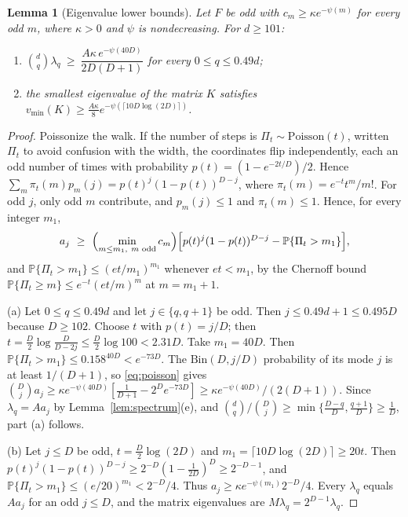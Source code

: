\documentclass[11pt]{article}
\newtheorem{lemma}[theorem]{Lemma}
\theoremstyle{definition}\newtheorem{assumption}[theorem]{Assumption}
\theoremstyle{remark}\newtheorem{remark}[theorem]{Remark}
\newcommand{\Pp}{\mathbb P}
\begin{document}
\begin{lemma}[Eigenvalue lower bounds]\label{lem:eiglower}
Let $F$ be odd with $c_m\ge\kappa e^{-\psi(m)}$ for every odd $m$, where
$\kappa>0$ and $\psi$ is nondecreasing. For $d\ge101$:
\begin{enumerate}
\item[(a)] $\binom dq\lambda_q\ \ge\ \dfrac{A\kappa\,
e^{-\psi(40D)}}{2D(D+1)}$ for every $0\le q\le0.49d$;
\item[(b)] the smallest eigenvalue of the matrix $K$ satisfies
$v_{\min}(K)\ge\frac{A\kappa}8e^{-\psi(\lceil10D\log(2D)\rceil)}$.
\end{enumerate}
\end{lemma}
\begin{proof}
Poissonize the walk. If the number of steps is $\Pi_t\sim\mathrm{Poisson}(t)$, written $\Pi_t$ to avoid confusion with the width,
the coordinates flip independently, each an odd number of times with
probability $p(t)=(1-e^{-2t/D})/2$. Hence
$\sum_m\pi_t(m)p_m(j)=p(t)^j(1-p(t))^{D-j}$, where
$\pi_t(m)=e^{-t}t^m/m!$. For odd $j$, only odd $m$ contribute, and
$p_m(j)\le1$ and $\pi_t(m)\le1$. Hence, for every integer $m_1$,
\begin{equation}\label{eq:poisson}
 a_j\ \ge\ \Bigl(\min_{m\le m_1,\ m\text{ odd}}c_m\Bigr)
 \Bigl[p(t)^j(1-p(t))^{D-j}-\Pp\{\Pi_t>m_1\}\Bigr],
\end{equation}
and $\Pp\{\Pi_t>m_1\}\le(et/m_1)^{m_1}$ whenever $et<m_1$, by the Chernoff bound $\Pp\{\Pi_t\ge m\}\le e^{-t}(et/m)^m$ at $m=m_1+1$.

(a) Let $0\le q\le0.49d$ and let $j\in\{q,q+1\}$ be odd. Then
$j\le0.49d+1\le0.495D$ because $D\ge102$. Choose $t$ with
$p(t)=j/D$; then $t=\frac D2\log\frac D{D-2j}\le\frac D2\log100<2.31D$.
Take $m_1=40D$. Then $\Pp\{\Pi_t>m_1\}\le0.158^{40D}<e^{-73D}$. The
$\mathrm{Bin}(D,j/D)$ probability of its mode $j$ is at least $1/(D+1)$,
so \eqref{eq:poisson} gives
$\binom Dja_j\ge\kappa e^{-\psi(40D)}[\frac1{D+1}-2^De^{-73D}]\ge
\kappa e^{-\psi(40D)}/(2(D+1))$. Since
$\lambda_q=Aa_j$ by Lemma~\ref{lem:spectrum}(e), and
$\binom dq/\binom Dj\ge\min\{\frac{D-q}D,\frac{q+1}D\}\ge\frac1D$, part (a)
follows.

(b) Let $j\le D$ be odd, $t=\frac D2\log(2D)$ and
$m_1=\lceil10D\log(2D)\rceil\ge20t$. Then
$p(t)^j(1-p(t))^{D-j}\ge2^{-D}(1-\frac1{2D})^D\ge2^{-D-1}$, and
$\Pp\{\Pi_t>m_1\}\le(e/20)^{m_1}<2^{-D}/4$. Thus $a_j\ge\kappa
e^{-\psi(m_1)}2^{-D}/4$. Every $\lambda_q$ equals $Aa_j$ for an odd $j\le D$,
and the matrix eigenvalues are $M\lambda_q=2^{D-1}\lambda_q$.
\end{proof}
\end{document}
